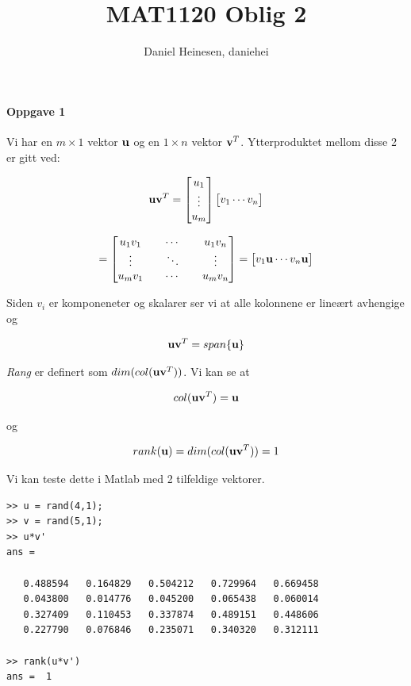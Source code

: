 \documentclass[a4paper,norsk, 10pt]{article}
\title{MAT1120 Oblig 2}
\author{Daniel Heinesen, daniehei}
\begin{document}
\maketitle

\paragraph*{Oppgave 1}

Vi har en $m \times 1$ vektor $\bold{u}$ og en $1 \times n$ vektor $\bold{v}^T$. Ytterproduktet mellom disse 2 er gitt ved:

$$
\bold{u}\bold{v}^T =
\begin{bmatrix}
 u_1\\
 \vdots \\
{u}_m 
\end{bmatrix}
\begin{bmatrix}
{v}_1
\cdots 
{v}_n 
\end{bmatrix}
$$ 

$$
=
\begin{bmatrix}
u_1 v_1 && \cdots && u_1 v_n \\
\vdots && \ddots && \vdots \\
u_mv_1 && \cdots && u_m v_n
\end{bmatrix}
=
\begin{bmatrix}
v_1\bold{u} \cdots v_n\bold{u}
\end{bmatrix} 
$$

Siden $v_i$ er komponeneter og skalarer ser vi at alle kolonnene er lineært avhengige og 

\begin{equation}
\bold{u}\bold{v}^T = span\{ \bold{u} \}
\end{equation}

\textit{Rang} er definert som $dim(col(\bold{u}\bold{v}^T))$. Vi kan se at 

$$
col(\bold{u}\bold{v}^T) = \bold{u}
$$

og 

\begin{equation}
rank(\bold{u}) = dim(col(\bold{u}\bold{v}^T)) = 1 
\end{equation}

Vi kan teste dette i Matlab med 2 tilfeldige vektorer. 

\begin{verbatim}
>> u = rand(4,1);
>> v = rand(5,1);
>> u*v'
ans =

   0.488594   0.164829   0.504212   0.729964   0.669458
   0.043800   0.014776   0.045200   0.065438   0.060014
   0.327409   0.110453   0.337874   0.489151   0.448606
   0.227790   0.076846   0.235071   0.340320   0.312111

>> rank(u*v')
ans =  1
\end{verbatim}
\end{document}
